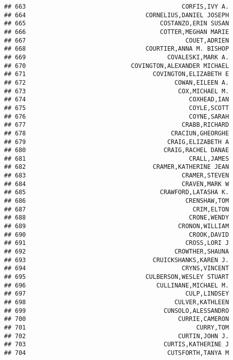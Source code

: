\documentclass[
]{article}
\begin{document}
\begin{verbatim}
## 663                                           CORFIS,IVY A.
## 664                                 CORNELIUS,DANIEL JOSEPH
## 665                                     COSTANZO,ERIN SUSAN
## 666                                     COTTER,MEGHAN MARIE
## 667                                            COUET,ADRIEN
## 668                                 COURTIER,ANNA M. BISHOP
## 669                                       COVALESKI,MARK A.
## 670                             COVINGTON,ALEXANDER MICHAEL
## 671                                   COVINGTON,ELIZABETH E
## 672                                         COWAN,EILEEN A.
## 673                                          COX,MICHAEL M.
## 674                                             COXHEAD,IAN
## 675                                             COYLE,SCOTT
## 676                                             COYNE,SARAH
## 677                                           CRABB,RICHARD
## 678                                        CRACIUN,GHEORGHE
## 679                                       CRAIG,ELIZABETH A
## 680                                      CRAIG,RACHEL DANAE
## 681                                             CRALL,JAMES
## 682                                   CRAMER,KATHERINE JEAN
## 683                                           CRAMER,STEVEN
## 684                                           CRAVEN,MARK W
## 685                                     CRAWFORD,LATASHA K.
## 686                                            CRENSHAW,TOM
## 687                                              CRIM,ELTON
## 688                                             CRONE,WENDY
## 689                                          CRONON,WILLIAM
## 690                                             CROOK,DAVID
## 691                                            CROSS,LORI J
## 692                                         CROWTHER,SHAUNA
## 693                                   CRUICKSHANKS,KAREN J.
## 694                                           CRYNS,VINCENT
## 695                                 CULBERSON,WESLEY STUART
## 696                                    CULLINANE,MICHAEL M.
## 697                                            CULP,LINDSEY
## 698                                         CULVER,KATHLEEN
## 699                                      CUNSOLO,ALESSANDRO
## 700                                          CURRIE,CAMERON
## 701                                               CURRY,TOM
## 702                                          CURTIN,JOHN J.
## 703                                      CURTIS,KATHERINE J
## 704                                       CUTSFORTH,TANYA M

\end{verbatim}
\end{document}
